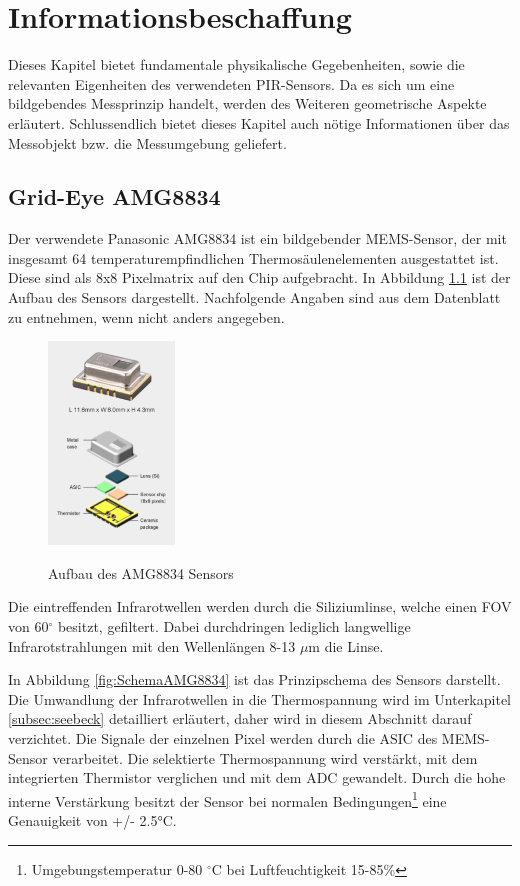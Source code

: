 \chapter{Informationsbeschaffung}
\label{chap:Informationsbeschaffung}
Dieses Kapitel bietet fundamentale physikalische Gegebenheiten, sowie die relevanten Eigenheiten des verwendeten \ac{PIR}-Sensors. Da es sich um eine bildgebendes Messprinzip handelt, werden des Weiteren geometrische Aspekte erläutert. Schlussendlich bietet dieses Kapitel auch nötige Informationen über das Messobjekt bzw. die Messumgebung geliefert.

\section{Grid-Eye AMG8834}
\label{sec:AMG8834}

Der verwendete Panasonic AMG8834 ist ein bildgebender \ac{MEMS}-Sensor, der mit insgesamt 64 temperaturempfindlichen Thermosäulenelementen ausgestattet ist. Diese sind als 8x8 Pixelmatrix auf den Chip aufgebracht. In Abbildung \ref{fig:Explosionsdarstellung} ist der Aufbau des Sensors dargestellt. Nachfolgende Angaben sind aus dem Datenblatt zu entnehmen, wenn nicht anders angegeben.
 
\begin{figure}[H]
	\centering
	\includegraphics[width=0.3\textwidth]
	{fig/grid_eye_aufbau.PNG}
	\caption[Aufbau des AMG8834 Sensors]{Aufbau des AMG8834 Sensors} \protect\cite{AMG8834}
	\label{fig:Explosionsdarstellung}
\end{figure}
Die eintreffenden Infrarotwellen werden durch die Siliziumlinse, welche einen \ac{FOV} von 60$^\circ$ besitzt, gefiltert. Dabei durchdringen lediglich langwellige Infrarotstrahlungen mit den Wellenlängen 8-13 $\mu$m die Linse. 

In Abbildung \ref{fig:SchemaAMG8834} ist das Prinzipschema des Sensors darstellt. Die Umwandlung der Infrarotwellen in die Thermospannung wird im Unterkapitel \ref{subsec:seebeck} detailliert erläutert, daher wird in diesem Abschnitt darauf verzichtet. Die Signale der einzelnen Pixel werden durch die \ac{ASIC} des \ac{MEMS}-Sensor verarbeitet. Die selektierte Thermospannung wird verstärkt, mit dem integrierten Thermistor verglichen und mit dem \ac{ADC} gewandelt. Durch die hohe interne Verstärkung besitzt der Sensor bei normalen Bedingungen\footnote[1]{Umgebungstemperatur 0-80 $^\circ$C bei Luftfeuchtigkeit 15-85\%} eine Genauigkeit von +/- 2.5°C. 

